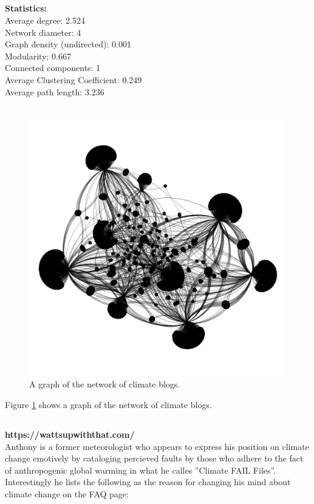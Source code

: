 \documentclass[11pt]{article}
\begin{document}
\subsection{}
\textbf{Statistics:}\\
Average degree: \hfill 2.524\\
Network diameter: \hfill 4\\
Graph density (undirected): \hfill 0.001\\
Modularity: \hfill 0.667\\
Connected components: \hfill 1\\
Average Clustering Coefficient: \hfill 0.249\\
Average path length: \hfill 3.236\\
\\
\begin{figure}
  \includegraphics[width=\linewidth]{Figure_2.png}
  \caption{A graph of the network of climate blogs.}
  \label{fig:graph}
\end{figure}

Figure \ref{fig:graph} shows a graph of the network of climate blogs.

\subsection{}
\textbf{https://wattsupwiththat.com/}\\
Anthony is a former meteorologist who appears to express his position on climate
change emotively by cataloging percieved faults by those who adhere to the fact of
anthropogenic global warming in what he calles ''Climate FAIL Files''. Interestingly
he lists the following as the reason for changing his mind about climate change on
the FAQ page:
\end{document}
